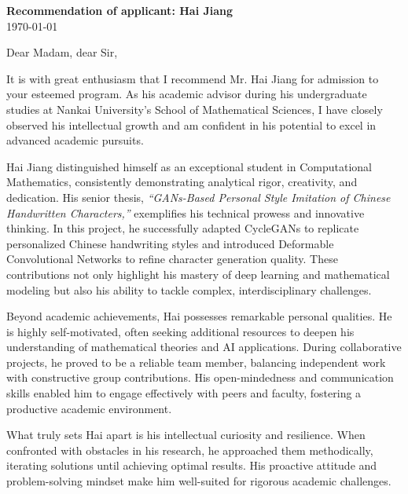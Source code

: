 \documentclass{article}
\begin{document}
\textbf{Recommendation of applicant: Hai Jiang}\\
\today \bigskip\\ %
\vspace{-3em}




\bigskip %
\vspace{10pt}


Dear Madam, dear Sir, 

It is with great enthusiasm that I recommend Mr. Hai Jiang for admission to your esteemed program. 
As his academic advisor during his undergraduate studies at Nankai University's School of Mathematical Sciences, 
I have closely observed his intellectual growth and am confident in his potential to excel in advanced academic pursuits.

Hai Jiang distinguished himself as an exceptional student in Computational Mathematics, 
consistently demonstrating analytical rigor, creativity, and dedication. 
His senior thesis, \emph{``GANs-Based Personal Style Imitation of Chinese Handwritten Characters,'' }
exemplifies his technical prowess and innovative thinking. 
In this project, 
he successfully adapted CycleGANs to replicate personalized Chinese handwriting styles and introduced Deformable Convolutional Networks to refine character generation quality. 
These contributions not only highlight his mastery of deep learning and mathematical modeling but also his ability to tackle complex, interdisciplinary challenges.

Beyond academic achievements, Hai possesses remarkable personal qualities. 
He is highly self-motivated, often seeking additional resources to deepen his understanding of mathematical theories and AI applications. 
During collaborative projects, he proved to be a reliable team member, 
balancing independent work with constructive group contributions. 
His open-mindedness and communication skills enabled him to engage effectively with peers and faculty, 
fostering a productive academic environment.

What truly sets Hai apart is his intellectual curiosity and resilience. 
When confronted with obstacles in his research, he approached them methodically, 
iterating solutions until achieving optimal results. 
His proactive attitude and problem-solving mindset make him well-suited for rigorous academic challenges.
\end{document}
